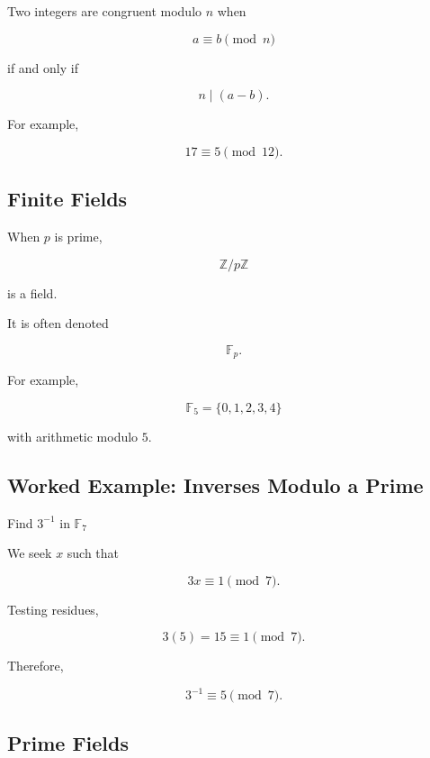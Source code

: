 Two integers are congruent modulo \(n\) when

\[
\boxed{
a\equiv b\pmod n
}
\]

if and only if

\[
\boxed{
n\mid(a-b).
}
\]

For example,

\[
\boxed{
17\equiv5\pmod{12}.
}
\]

\subsection{Finite Fields}
\label{subsec:finite-fields-reference}

When \(p\) is prime,

\[
\boxed{
\mathbb{Z}/p\mathbb{Z}
}
\]

is a field.

It is often denoted

\[
\boxed{
\mathbb{F}_p.
}
\]

For example,

\[
\boxed{
\mathbb{F}_5
=
\{0,1,2,3,4\}
}
\]

with arithmetic modulo \(5\).

\subsection{Worked Example: Inverses Modulo a Prime}
\label{subsec:worked-modular-inverse-prime}

\begin{workedexamplebox}{Find \(3^{-1}\) in \(\mathbb{F}_7\)}

We seek \(x\) such that

\[
3x
\equiv
1
\pmod7.
\]

Testing residues,

\[
3(5)
=
15
\equiv
1
\pmod7.
\]

Therefore,

\begin{answerbox}
\[
\boxed{
3^{-1}
\equiv
5
\pmod7.
}
\]
\end{answerbox}

\end{workedexamplebox}

\subsection{Prime Fields}
\label{subsec:prime-fields-reference}


